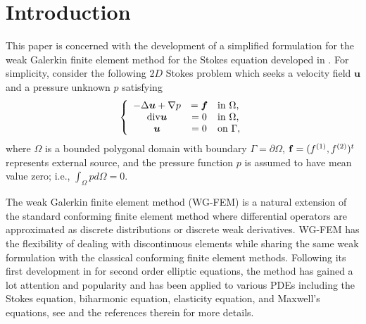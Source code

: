 \documentclass[final,leqno]{siamltex704}
\begin{document}
\section{Introduction}
This paper is concerned with the development of a simplified formulation for the weak Galerkin finite element method for the Stokes equation developed in \cite{wy-stokes}. For simplicity, consider the following $2D$ Stokes problem which seeks a velocity field $\bm{u}$ and a pressure unknown $p$ satisfying
\begin{equation}\label{Equ.Stokes}
\left\{
\begin{array}{ccl}
-\Delta \bm{u}+ \nabla p &=\bm{f}  &{\rm in}\ \Omega,\\
{\rm div} \bm{u}&=0                &{\rm in}\ \Omega,\\
 \bm{u}&=0                         &{\rm on}\ \Gamma,
\end{array}
\right.
\end{equation}
where $\Omega$ is a bounded polygonal domain with boundary $\Gamma=\partial\Omega$, ${\bf f}=(f^{(1)},f^{(2)})^t$ represents external source, and the pressure function $p$ is assumed to have mean value zero; i.e., $\int_{\Omega} p d\Omega =0$.

The weak Galerkin finite element method (WG-FEM) is a natural extension of the standard conforming finite element method where differential operators are approximated as discrete distributions or discrete weak derivatives. WG-FEM has the flexibility of dealing with discontinuous elements while sharing the same weak formulation with the classical conforming finite element methods. Following its first development in \cite{WangYe_2013,wy3655} for second order elliptic equations, the method has gained a lot attention and popularity and has been applied to various PDEs including the Stokes equation, biharmonic equation, elasticity equation, and Maxwell's equations, see \cite{WangWang_2016,RXZZ-JCAM-2016,LiDanWW} and the references therein for more details.
\end{document}
